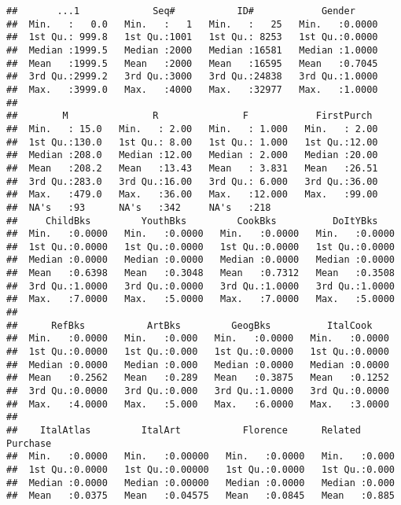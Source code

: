 \documentclass[
]{article}
\begin{document}
\begin{verbatim}
##       ...1             Seq#           ID#            Gender      
##  Min.   :   0.0   Min.   :   1   Min.   :   25   Min.   :0.0000  
##  1st Qu.: 999.8   1st Qu.:1001   1st Qu.: 8253   1st Qu.:0.0000  
##  Median :1999.5   Median :2000   Median :16581   Median :1.0000  
##  Mean   :1999.5   Mean   :2000   Mean   :16595   Mean   :0.7045  
##  3rd Qu.:2999.2   3rd Qu.:3000   3rd Qu.:24838   3rd Qu.:1.0000  
##  Max.   :3999.0   Max.   :4000   Max.   :32977   Max.   :1.0000  
##                                                                  
##        M               R               F            FirstPurch   
##  Min.   : 15.0   Min.   : 2.00   Min.   : 1.000   Min.   : 2.00  
##  1st Qu.:130.0   1st Qu.: 8.00   1st Qu.: 1.000   1st Qu.:12.00  
##  Median :208.0   Median :12.00   Median : 2.000   Median :20.00  
##  Mean   :208.2   Mean   :13.43   Mean   : 3.831   Mean   :26.51  
##  3rd Qu.:283.0   3rd Qu.:16.00   3rd Qu.: 6.000   3rd Qu.:36.00  
##  Max.   :479.0   Max.   :36.00   Max.   :12.000   Max.   :99.00  
##  NA's   :93      NA's   :342     NA's   :218                     
##     ChildBks         YouthBks         CookBks          DoItYBks     
##  Min.   :0.0000   Min.   :0.0000   Min.   :0.0000   Min.   :0.0000  
##  1st Qu.:0.0000   1st Qu.:0.0000   1st Qu.:0.0000   1st Qu.:0.0000  
##  Median :0.0000   Median :0.0000   Median :0.0000   Median :0.0000  
##  Mean   :0.6398   Mean   :0.3048   Mean   :0.7312   Mean   :0.3508  
##  3rd Qu.:1.0000   3rd Qu.:0.0000   3rd Qu.:1.0000   3rd Qu.:1.0000  
##  Max.   :7.0000   Max.   :5.0000   Max.   :7.0000   Max.   :5.0000  
##                                                                     
##      RefBks           ArtBks         GeogBks          ItalCook     
##  Min.   :0.0000   Min.   :0.000   Min.   :0.0000   Min.   :0.0000  
##  1st Qu.:0.0000   1st Qu.:0.000   1st Qu.:0.0000   1st Qu.:0.0000  
##  Median :0.0000   Median :0.000   Median :0.0000   Median :0.0000  
##  Mean   :0.2562   Mean   :0.289   Mean   :0.3875   Mean   :0.1252  
##  3rd Qu.:0.0000   3rd Qu.:0.000   3rd Qu.:1.0000   3rd Qu.:0.0000  
##  Max.   :4.0000   Max.   :5.000   Max.   :6.0000   Max.   :3.0000  
##                                                                    
##    ItalAtlas         ItalArt           Florence      Related Purchase
##  Min.   :0.0000   Min.   :0.00000   Min.   :0.0000   Min.   :0.000   
##  1st Qu.:0.0000   1st Qu.:0.00000   1st Qu.:0.0000   1st Qu.:0.000   
##  Median :0.0000   Median :0.00000   Median :0.0000   Median :0.000   
##  Mean   :0.0375   Mean   :0.04575   Mean   :0.0845   Mean   :0.885   

\end{verbatim}
\end{document}
